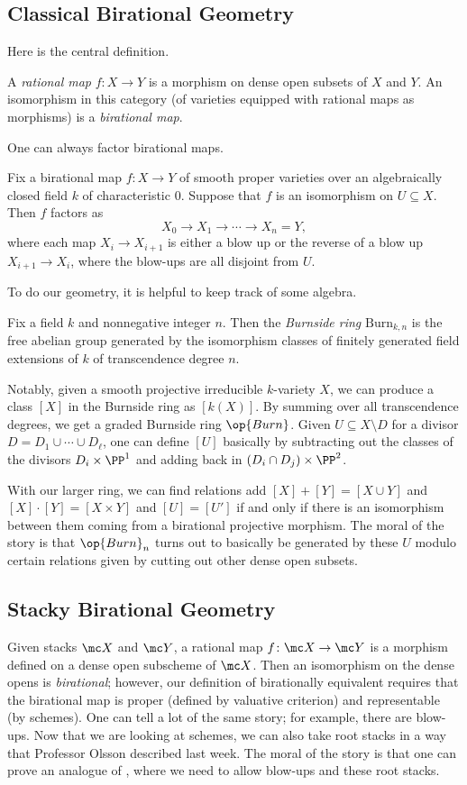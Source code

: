 \documentclass{article}
\begin{document}
\subsection{Classical Birational Geometry}
Here is the central definition.
\begin{definition}[birational]
    A \textit{rational map} $f\colon X\to Y$ is a morphism on dense open subsets of $X$ and $Y$. An isomorphism in this category (of varieties equipped with rational maps as morphisms) is a \textit{birational map}.
\end{definition}
One can always factor birational maps.
\begin{theorem} \label{thm:weak-factorization}
    Fix a birational map $f\colon X\to Y$ of smooth proper varieties over an algebraically closed field $k$ of characteristic $0$. Suppose that $f$ is an isomorphism on $U\subseteq X$. Then $f$ factors as
    \[X_0\to X_1\to\cdots\to X_n=Y,\]
    where each map $X_i\to X_{i+1}$ is either a blow up or the reverse of a blow up $X_{i+1}\to X_i$, where the blow-ups are all disjoint from $U$.
\end{theorem}
To do our geometry, it is helpful to keep track of some algebra.
\begin{definition}
    Fix a field $k$ and nonnegative integer $n$. Then the \textit{Burnside ring} $\mathrm{Burn}_{k,n}$ is the free abelian group generated by the isomorphism classes of finitely generated field extensions of $k$ of transcendence degree $n$.
\end{definition}
Notably, given a smooth projective irreducible $k$-variety $X$, we can produce a class $[X]$ in the Burnside ring as $[k(X)]$. By summing over all transcendence degrees, we get a graded Burnside ring $\op{Burn}$. Given $U\subseteq X\setminus D$ for a divisor $D=D_1\cup\cdots\cup D_\ell$, one can define $[U]$ basically by subtracting out the classes of the divisors $D_i\times\PP^1$ and adding back in $(D_i\cap D_j)\times\PP^2$.

With our larger ring, we can find relations add $[X]+[Y]=[X\cup Y]$ and $[X]\cdot[Y]=[X\times Y]$ and $[U]=[U']$ if and only if there is an isomorphism between them coming from a birational projective morphism. The moral of the story is that $\op{Burn}_n$ turns out to basically be generated by these $U$ modulo certain relations given by cutting out other dense open subsets.

\subsection{Stacky Birational Geometry}
Given stacks $\mc X$ and $\mc Y$, a rational map $f\colon\mc X\to\mc Y$ is a morphism defined on a dense open subscheme of $\mc X$. Then an isomorphism on the dense opens is \textit{birational}; however, our definition of birationally equivalent requires that the birational map is proper (defined by valuative criterion) and representable (by schemes). One can tell a lot of the same story; for example, there are blow-ups. Now that we are looking at schemes, we can also take root stacks in a way that Professor Olsson described last week. The moral of the story is that one can prove an analogue of , where we need to allow blow-ups and these root stacks.
\end{document}
